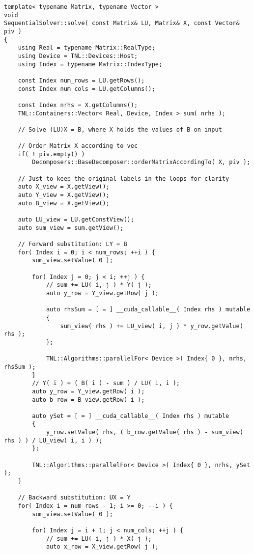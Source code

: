 \begin{lstlisting}[caption={Excerpt from the implementation of SSPP.
The code has been slightly modified for brevity, for example, the checks for appropriate sizing of matrices and vectors have been removed.},label={Listing:SSPP-implementation-excerpt}]
template< typename Matrix, typename Vector >
void
SequentialSolver::solve( const Matrix& LU, Matrix& X, const Vector& piv )
{
	using Real = typename Matrix::RealType;
	using Device = TNL::Devices::Host;
	using Index = typename Matrix::IndexType;
	
	const Index num_rows = LU.getRows();
	const Index num_cols = LU.getColumns();
	
	const Index nrhs = X.getColumns();
	TNL::Containers::Vector< Real, Device, Index > sum( nrhs );
	
	// Solve (LU)X = B, where X holds the values of B on input
	
	// Order Matrix X according to vec
	if( ! piv.empty() )
		Decomposers::BaseDecomposer::orderMatrixAccordingTo( X, piv );
	
	// Just to keep the original labels in the loops for clarity
	auto X_view = X.getView();
	auto Y_view = X.getView();
	auto B_view = X.getView();
	
	auto LU_view = LU.getConstView();
	auto sum_view = sum.getView();
	
	// Forward substitution: LY = B
	for( Index i = 0; i < num_rows; ++i ) {
		sum_view.setValue( 0 );
		
		for( Index j = 0; j < i; ++j ) {
			// sum += LU( i, j ) * Y( j );
			auto y_row = Y_view.getRow( j );
			
			auto rhsSum = [ = ] __cuda_callable__( Index rhs ) mutable
			{
				sum_view( rhs ) += LU_view( i, j ) * y_row.getValue( rhs );
			};
			
			TNL::Algorithms::parallelFor< Device >( Index{ 0 }, nrhs, rhsSum );
		}
		// Y( i ) = ( B( i ) - sum ) / LU( i, i );
		auto y_row = Y_view.getRow( i );
		auto b_row = B_view.getRow( i );
		
		auto ySet = [ = ] __cuda_callable__( Index rhs ) mutable
		{
			y_row.setValue( rhs, ( b_row.getValue( rhs ) - sum_view( rhs ) ) / LU_view( i, i ) );
		};
		
		TNL::Algorithms::parallelFor< Device >( Index{ 0 }, nrhs, ySet );
	}
	
	// Backward substitution: UX = Y
	for( Index i = num_rows - 1; i >= 0; --i ) {
		sum_view.setValue( 0 );
		
		for( Index j = i + 1; j < num_cols; ++j ) {
			// sum += LU( i, j ) * X( j );
			auto x_row = X_view.getRow( j );
			

\end{lstlisting}
